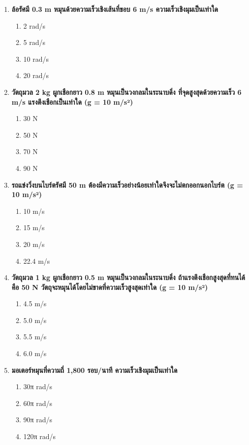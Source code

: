\documentclass[12pt]{article}
\begin{document}
\begin{enumerate}
\begin{enumerate}[label=\alph*)]
\item เพิ่ม 4 เท่า
\end{enumerate}
\item \textbf{ล้อรัศมี 0.3 m หมุนด้วยความเร็วเชิงเส้นที่ขอบ 6 m/s ความเร็วเชิงมุมเป็นเท่าใด}
\begin{enumerate}[label=\alph*)]
\item 2 rad/s
\item 5 rad/s
\item 10 rad/s
\item 20 rad/s
\end{enumerate}
\item \textbf{วัตถุมวล 2 kg ผูกเชือกยาว 0.8 m หมุนเป็นวงกลมในระนาบดิ่ง ที่จุดสูงสุดด้วยความเร็ว 6 m/s แรงตึงเชือกเป็นเท่าใด (g = 10 m/s²)}
\begin{enumerate}[label=\alph*)]
\item 30 N
\item 50 N
\item 70 N
\item 90 N
\end{enumerate}
\item \textbf{รถแข่งวิ่งบนไบร์ตรัศมี 50 m ต้องมีความเร็วอย่างน้อยเท่าใดจึงจะไม่ตกออกนอกไบร์ต (g = 10 m/s²)}
\begin{enumerate}[label=\alph*)]
\item 10 m/s
\item 15 m/s
\item 20 m/s
\item 22.4 m/s
\end{enumerate}
\item \textbf{วัตถุมวล 1 kg ผูกเชือกยาว 0.5 m หมุนเป็นวงกลมในระนาบดิ่ง ถ้าแรงตึงเชือกสูงสุดที่ทนได้คือ 50 N วัตถุจะหมุนได้โดยไม่ขาดที่ความเร็วสูงสุดเท่าใด (g = 10 m/s²)}
\begin{enumerate}[label=\alph*)]
\item 4.5 m/s
\item 5.0 m/s
\item 5.5 m/s
\item 6.0 m/s
\end{enumerate}
\item \textbf{มอเตอร์หมุนที่ความถี่ 1,800 รอบ/นาที ความเร็วเชิงมุมเป็นเท่าใด}
\begin{enumerate}[label=\alph*)]
\item 30π rad/s
\item 60π rad/s
\item 90π rad/s
\item 120π rad/s
\end{enumerate}

\end{enumerate}
\end{document}
